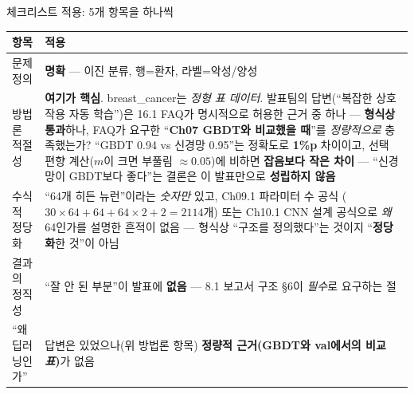 \documentclass[aspectratio=169,11pt]{beamer}
\begin{document}
\begin{frame}{체크리스트 적용: 5개 항목을 하나씩}
  \small
  \begin{tabular}{@{}p{2.9cm}p{11.7cm}@{}}
    \toprule
    항목 & 적용 \\
    \midrule
    문제 정의 & \textbf{명확} — 이진 분류, 행=환자, 라벨=악성/양성 \\
    방법론 적절성 & \textbf{여기가 핵심}. breast\_cancer는
      \textit{정형 표 데이터}. 발표팀의 답변(``복잡한 상호작용 자동
      학습'')은 16.1 FAQ가 명시적으로 허용한 근거 중 하나 —
      \textbf{형식상 통과}하나, FAQ가 요구한 ``\textbf{Ch07 GBDT와
      비교했을 때}''를 \textit{정량적으로} 충족했는가? ``GBDT 0.94
      vs 신경망 0.95''는 정확도로 \textbf{1\%p} 차이이고, 선택 편향
      계산($m$이 크면 부풀림 $\approx 0.05$)에 비하면
      \textbf{잡음보다 작은 차이} — ``신경망이 GBDT보다 좋다''는
      결론은 이 발표만으로 \textbf{성립하지 않음} \\
    수식적 정당화 & ``64개 히든 뉴런''이라는 \textit{숫자만} 있고,
      Ch09.1 파라미터 수 공식 ($30\times64 + 64 + 64\times2 + 2 =
      2114$개) 또는 Ch10.1 CNN 설계 공식으로 \textit{왜} 64인가를
      설명한 흔적이 없음 — 형식상 ``구조를 정의했다''는 것이지
      ``\textbf{정당화}한 것''이 아님 \\
    결과의 정직성 & ``잘 안 된 부분''이 발표에 \textbf{없음} —
      8.1 보고서 구조 §6이 \textit{필수}로 요구하는 절 \\
    ``왜 딥러닝인가'' & 답변은 있었으나(위 방법론 항목)
      \textbf{정량적 근거(GBDT와 val에서의 비교 \textit{표})}가
      없음 \\
    \bottomrule
  \end{tabular}
\end{frame}

\end{document}
